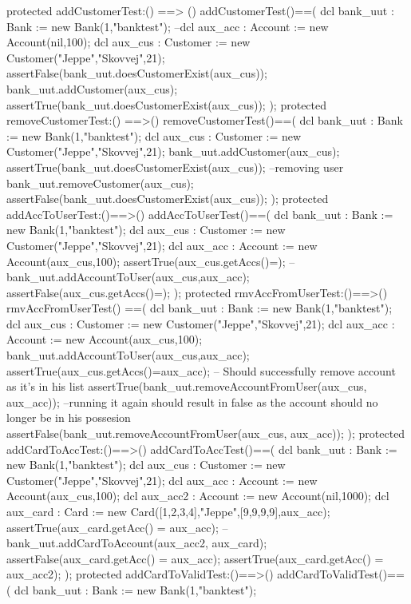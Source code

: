 \documentclass[a4paper]{article}
\begin{document}
\begin{vdm_al}
    protected addCustomerTest:() ==> ()
    addCustomerTest()==(
        dcl bank_uut : Bank := new Bank(1,"banktest");
        --dcl aux_acc : Account := new Account(nil,100);
        dcl aux_cus : Customer := new Customer("Jeppe","Skovvej",21);
        assertFalse(bank_uut.doesCustomerExist(aux_cus));
        bank_uut.addCustomer(aux_cus);
        assertTrue(bank_uut.doesCustomerExist(aux_cus));
    );
    protected removeCustomerTest:() ==>()
    removeCustomerTest()==(
        dcl bank_uut : Bank := new Bank(1,"banktest");
        dcl aux_cus : Customer := new Customer("Jeppe","Skovvej",21);
        bank_uut.addCustomer(aux_cus); 
        assertTrue(bank_uut.doesCustomerExist(aux_cus));
        --removing user
        bank_uut.removeCustomer(aux_cus);
        assertFalse(bank_uut.doesCustomerExist(aux_cus));
    );
    protected addAccToUserTest:()==>()
    addAccToUserTest()==(
        dcl bank_uut : Bank := new Bank(1,"banktest");
        dcl aux_cus : Customer := new Customer("Jeppe","Skovvej",21);
        dcl aux_acc : Account := new Account(aux_cus,100);
        assertTrue(aux_cus.getAccs()={});
        --
        bank_uut.addAccountToUser(aux_cus,aux_acc);
        assertFalse(aux_cus.getAccs()={});
    );
    protected rmvAccFromUserTest:()==>()
    rmvAccFromUserTest() ==(
        dcl bank_uut : Bank := new Bank(1,"banktest");
        dcl aux_cus : Customer := new Customer("Jeppe","Skovvej",21);
        dcl aux_acc : Account := new Account(aux_cus,100);
        bank_uut.addAccountToUser(aux_cus,aux_acc);
        assertTrue(aux_cus.getAccs()={aux_acc});
        -- Should successfully remove account as it's in his list
        assertTrue(bank_uut.removeAccountFromUser(aux_cus, aux_acc));
        --running it again should result in false as the account should no longer be in his possesion
        assertFalse(bank_uut.removeAccountFromUser(aux_cus, aux_acc));
    );
    protected addCardToAccTest:()==>()
    addCardToAccTest()==(
        dcl bank_uut : Bank := new Bank(1,"banktest");
        dcl aux_cus : Customer := new Customer("Jeppe","Skovvej",21);
        dcl aux_acc : Account := new Account(aux_cus,100);
        dcl aux_acc2 : Account := new Account(nil,1000);
        dcl aux_card : Card := new Card([1,2,3,4],"Jeppe",[9,9,9,9],aux_acc);
        assertTrue(aux_card.getAcc() = aux_acc);
        --
        bank_uut.addCardToAccount(aux_acc2, aux_card);
        assertFalse(aux_card.getAcc() = aux_acc);
        assertTrue(aux_card.getAcc() = aux_acc2);
    );
    protected addCardToValidTest:()==>()
    addCardToValidTest()==(
        dcl bank_uut : Bank := new Bank(1,"banktest");

\end{vdm_al}
\end{document}
